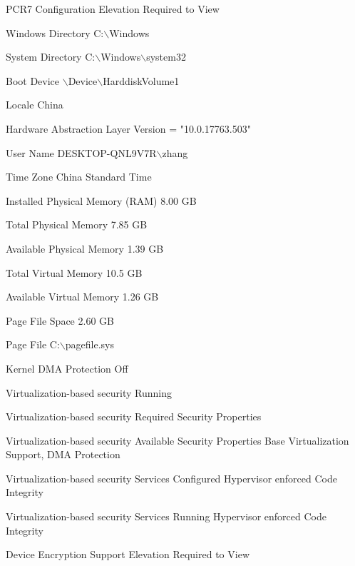 \documentclass[a4paper]{report}
\begin{document}
PCR7 Configuration	Elevation Required to View	
\par
Windows Directory	C:$\backslash$Windows	
\par
System Directory	C:$\backslash$Windows$\backslash$system32	
\par
Boot Device	$\backslash$Device$\backslash$HarddiskVolume1	
\par
Locale	 China	
\par 
Hardware Abstraction Layer	Version = "10.0.17763.503"	
\par
User Name	DESKTOP-QNL9V7R$\backslash$zhang	
\par
Time Zone	China Standard Time	
\par
Installed Physical Memory (RAM)	8.00 GB	
\par
Total Physical Memory	7.85 GB	
\par
Available Physical Memory	1.39 GB	
\par
Total Virtual Memory	10.5 GB	
\par
Available Virtual Memory	1.26 GB	
\par
Page File Space	2.60 GB	
\par
Page File	C:$\backslash$pagefile.sys	
\par
Kernel DMA Protection	Off	
\par
Virtualization-based security	Running	
\par
Virtualization-based security Required Security Properties		
\par
Virtualization-based security Available Security Properties	 Base Virtualization Support, DMA Protection
\par	
Virtualization-based security Services Configured	Hypervisor enforced Code Integrity	
\par
Virtualization-based security Services Running	Hypervisor enforced Code Integrity	
\par
Device Encryption Support	Elevation Required to View	
\par
\end{document}
